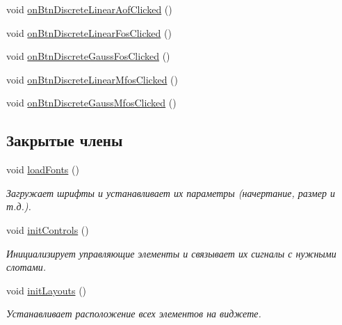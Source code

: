 \begin{DoxyCompactItemize}
\item 
void \hyperlink{class_filter_start_buttons_box_ac9e49cc4f6c8d9712c807e1b0711f67a}{on\+Btn\+Discrete\+Linear\+Aof\+Clicked} ()
\item 
void \hyperlink{class_filter_start_buttons_box_abca20b7c058a4305904912a8e9ea87db}{on\+Btn\+Discrete\+Linear\+Fos\+Clicked} ()
\item 
void \hyperlink{class_filter_start_buttons_box_a0285f32777c968c369c25c91940837d0}{on\+Btn\+Discrete\+Gauss\+Fos\+Clicked} ()
\item 
void \hyperlink{class_filter_start_buttons_box_ac200f7d204677620288463458a0d5dea}{on\+Btn\+Discrete\+Linear\+Mfos\+Clicked} ()
\item 
void \hyperlink{class_filter_start_buttons_box_adbba7359eb2dd93c889c62665f5f70c2}{on\+Btn\+Discrete\+Gauss\+Mfos\+Clicked} ()
\end{DoxyCompactItemize}

\subsection*{Закрытые члены}
\begin{DoxyCompactItemize}
\item 
void \hyperlink{class_filter_start_buttons_box_ae3a208f9857ce99c02506e4005f71a60}{load\+Fonts} ()
\begin{DoxyCompactList}\small\item\em Загружает шрифты и устанавливает их параметры (начертание, размер и т.\+д.). \end{DoxyCompactList}\item 
void \hyperlink{class_filter_start_buttons_box_a8803e94f68319169bbaeca632d07f9ff}{init\+Controls} ()\hypertarget{class_filter_start_buttons_box_a8803e94f68319169bbaeca632d07f9ff}{}\label{class_filter_start_buttons_box_a8803e94f68319169bbaeca632d07f9ff}

\begin{DoxyCompactList}\small\item\em Инициализирует управляющие элементы и связывает их сигналы с нужными слотами. \end{DoxyCompactList}\item 
void \hyperlink{class_filter_start_buttons_box_afe5d665350bff81aa8f2549fc2e26144}{init\+Layouts} ()\hypertarget{class_filter_start_buttons_box_afe5d665350bff81aa8f2549fc2e26144}{}\label{class_filter_start_buttons_box_afe5d665350bff81aa8f2549fc2e26144}

\begin{DoxyCompactList}\small\item\em Устанавливает расположение всех элементов на виджете. \end{DoxyCompactList}\end{DoxyCompactItemize}
